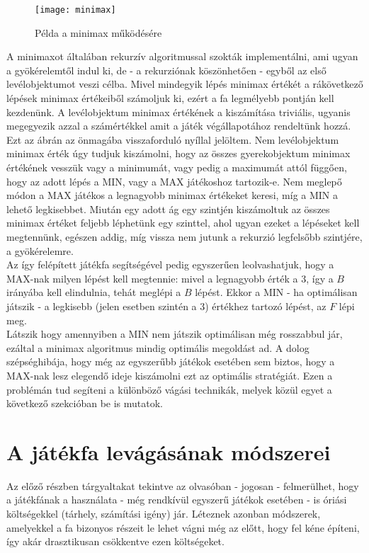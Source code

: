 \begin{figure}[h]
	\texttt{[image: minimax]}
	\centering
	\caption{Példa a minimax működésére}
	\label{fig:minimax}
\end{figure}

A minimaxot általában rekurzív algoritmussal szokták implementálni, ami ugyan a gyökérelemtől indul ki, de - a rekurziónak köszönhetően - egyből az első levélobjektumot veszi célba. Mivel mindegyik lépés minimax értékét a rákövetkező lépések minimax értékeiből számoljuk ki, ezért a fa legmélyebb pontján kell kezdenünk. A levélobjektum minimax értékének a kiszámítása triviális, ugyanis megegyezik azzal a számértékkel amit a játék végállapotához rendeltünk hozzá. Ezt az ábrán az önmagába visszaforduló nyíllal jelöltem. Nem levélobjektum minimax érték úgy tudjuk kiszámolni, hogy az összes gyerekobjektum minimax értékének vesszük vagy a minimumát, vagy pedig a maximumát attól függően, hogy az adott lépés a MIN, vagy a MAX játékoshoz tartozik-e. Nem meglepő módon a MAX játékos a legnagyobb minimax értékeket keresi, míg a MIN a lehető legkisebbet. Miután egy adott ág egy szintjén kiszámoltuk az összes minimax értéket feljebb léphetünk egy szinttel, ahol ugyan ezeket a lépéseket kell megtennünk, egészen addig, míg vissza nem jutunk a rekurzió legfelsőbb szintjére, a gyökérelemre.\\

Az így felépített játékfa segítségével pedig egyszerűen leolvashatjuk, hogy a MAX-nak milyen lépést kell megtennie: mivel a legnagyobb érték a 3, így a $B$ irányába kell elindulnia, tehát meglépi a $B$ lépést. Ekkor a MIN - ha optimálisan játszik - a legkisebb (jelen esetben szintén a 3) értékhez tartozó lépést, az $F$ lépi meg.\\

Látszik hogy amennyiben a MIN nem játszik optimálisan még rosszabbul jár, ezáltal a minimax algoritmus mindig optimális megoldást ad. A dolog szépséghibája, hogy még az egyszerűbb játékok esetében sem biztos, hogy a MAX-nak lesz elegendő ideje kiszámolni ezt az optimális stratégiát. Ezen a problémán tud segíteni a különböző vágási technikák, melyek közül egyet a következő szekcióban be is mutatok.


\section{A játékfa levágásának módszerei}
Az előző részben tárgyaltakat tekintve az olvasóban - jogosan - felmerülhet, hogy a játékfának a használata - még rendkívül egyszerű játékok esetében - is óriási költségekkel (tárhely, számítási igény) jár. Léteznek azonban módszerek, amelyekkel a fa bizonyos részeit le lehet vágni még az előtt, hogy fel kéne építeni, így akár drasztikusan csökkentve ezen költségeket.


